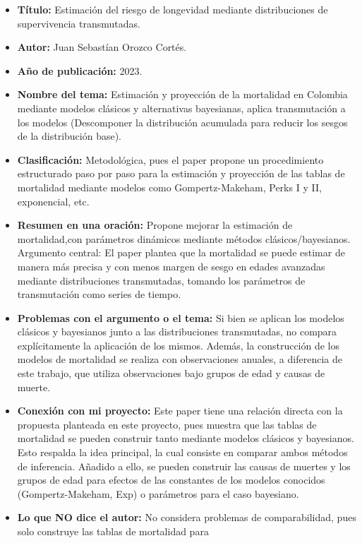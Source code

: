 \documentclass[
  letterpaper,
  DIV=11,
  numbers=noendperiod]{scrartcl}
\begin{document}
\begin{itemize}
\item
  \textbf{Título:} Estimación del riesgo de longevidad mediante
  distribuciones de supervivencia transmutadas.
\item
  \textbf{Autor:} Juan Sebastían Orozco Cortés.
\item
  \textbf{Año de publicación:} 2023.
\item
  \textbf{Nombre del tema:} Estimación y proyección de la mortalidad en
  Colombia mediante modelos clásicos y alternativas bayesianas, aplica
  transmutación a los modelos (Descomponer la distribución acumulada
  para reducir los sesgos de la distribución base).
\item
  \textbf{Clasificación:} Metodológica, pues el paper propone un
  procedimiento estructurado paso por paso para la estimación y
  proyección de las tablas de mortalidad mediante modelos como
  Gompertz-Makeham, Perks I y II, exponencial, etc.
\item
  \textbf{Resumen en una oración:} Propone mejorar la estimación de
  mortalidad,con parámetros dinámicos mediante métodos
  clásicos/bayesianos. Argumento central: El paper plantea que la
  mortalidad se puede estimar de manera más precisa y con menos margen
  de sesgo en edades avanzadas mediante distribuciones transmutadas,
  tomando los parámetros de transmutación como series de tiempo.
\item
  \textbf{Problemas con el argumento o el tema:} Si bien se aplican los
  modelos clásicos y bayesianos junto a las distribuciones transmutadas,
  no compara explícitamente la aplicación de los mismos. Además, la
  construcción de los modelos de mortalidad se realiza con observaciones
  anuales, a diferencia de este trabajo, que utiliza observaciones bajo
  grupos de edad y causas de muerte.
\item
  \textbf{Conexión con mi proyecto:} Este paper tiene una relación
  directa con la propuesta planteada en este proyecto, pues muestra que
  las tablas de mortalidad se pueden construir tanto mediante modelos
  clásicos y bayesianos. Esto respalda la idea principal, la cual
  consiste en comparar ambos métodos de inferencia. Añadido a ello, se
  pueden construir las causas de muertes y los grupos de edad para
  efectos de las constantes de los modelos conocidos (Gompertz-Makeham,
  Exp) o parámetros para el caso bayesiano.
\item
  \textbf{Lo que NO dice el autor:} No considera problemas de
  comparabilidad, pues solo construye las tablas de mortalidad para

\end{itemize}
\end{document}
